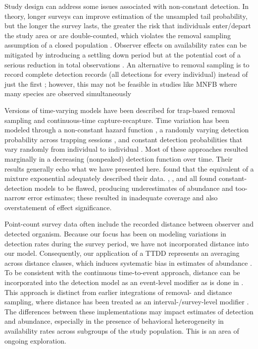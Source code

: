 \documentclass[12pt]{article}
\begin{document}
Study design can address some issues associated with non-constant detection.
In theory, longer surveys can improve estimation of the unsampled tail probability, but the longer the survey lasts, the greater the risk that individuals enter/depart the study area or are double-counted, which violates the removal sampling assumption of a closed population \citep{LeeMarsden2008, Reidy2011}.  
Observer effects on availability rates can be mitigated by introducing a settling down period but at the potential cost of a serious reduction in total observations \citep{LeeMarsden2008}.
An alternative to removal sampling is to record complete detection records (all detections for every individual) instead of just the first \citep{Alldredge2007}; however, this may not be feasible in studies like MNFB where many species are observed simultaneously

Versions of time-varying models have been described for trap-based removal sampling and continuous-time capture-recapture.  
Time variation has been modeled through a non-constant hazard function \citep{Schnute1983, HwangChao2002}, a randomly varying detection probability across trapping sessions \citep{WangLoneragan1996}, and constant detection probabilities that vary randomly from individual to individual \citep{Mantyniemi2005, Laplanche2010}.
Most of these approaches resulted marginally in a decreasing (nonpeaked) detection function over time.  
Their results generally echo what we have presented here.  
\citet{Schnute1983} found that the equivalent of a mixture exponential adequately described their data.
\citet{WangLoneragan1996}, \citet{HwangChao2002}, and \citet{Mantyniemi2005} all found constant-detection models to be flawed, producing underestimates of abundance and too-narrow error estimates; these resulted in inadequate coverage and also overstatement of effect significance.  


Point-count survey data often include the recorded distance between observer and detected organism.
Because our focus has been on modeling variations in detection rates during the survey period, we have not incorporated distance into our model.
Consequently, our application of a TTDD represents an averaging across distance classes, which induces systematic bias in estimates of abundance \citep{EffordDawson2009, Laake2011, Solymos2013}.  
To be consistent with the continuous time-to-event approach, distance can be incorporated into the detection model as an event-level modifier as is done in \cite{Borchers2016}.  
This approach is distinct from earlier integrations of removal- and distance sampling, where distance has been treated as an interval-/survey-level modifier \citep{Farnsworth2005, Diefenbach2007, Solymos2013, Amundson2014}.
The differences between these implementations may impact estimates of detection and abundance, especially in the presence of behavioral heterogeneity in availability rates across subgroups of the study population.  
This is an area of ongoing exploration.
\end{document}

